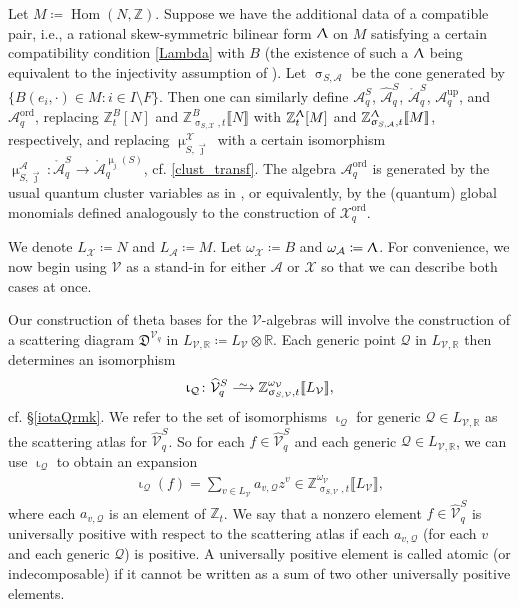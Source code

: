 \documentclass{amsart}
\DeclareMathOperator{\Hom}{Hom}
\DeclareMathOperator{\up}{up}
\DeclareMathOperator{\ord}{ord}
\let\llb=\llbracket
\let\rrb=\rrbracket
\let\bb=\mathbb
\let\rar=\rightarrow
\let\f=\mathfrak
\let\s=\mathcal
\let\wh=\widehat
\let\mr=\mathring
\def\risom{\buildrel\sim\over{\smashedlongrightarrow}}
\def\smashedlongrightarrow{\setbox0=\hbox{$\longrightarrow$}\ht0=1.25pt\box0}
\newcommand {\Zt} {\Z_t}
\newcommand {\sQ} {\mathcal{Q}}
\newcommand {\jj} {\vec{\jmath}}
\renewcommand{\iota}{\upiota}
\renewcommand{\sigma}{\upsigma}
\renewcommand{\Lambda}{\Uplambda}
\renewcommand{\mu}{\upmu}
\theoremstyle{plain}%
\newcommand{\Z}{{\mathbb Z}}
\theoremstyle{definition}
\theoremstyle{remark}
\begin{document}
Let $M\coloneqq \Hom(N,\bb{Z})$.  Suppose we have the additional data of a compatible pair, i.e., a rational skew-symmetric bilinear form $\Lambda$ on $M$ satisfying a certain compatibility condition \eqref{Lambda} with $B$ (the existence of such a $\Lambda$ being equivalent to the injectivity assumption of \cite{GHKK}).  Let $\sigma_{S,\s{A}}$ be the cone generated by $\{B(e_i,\cdot)\in M\colon i\in I\setminus F\}$.  Then one can similarly define $\s{A}_q^S$, $\wh{\s{A}}_q^S$, $\mr{\s{A}}_q^S$, $\s{A}_q^{\up}$, and $\s{A}_q^{\ord}$, replacing $\Z_t^B[N]$ and $\Z_{\sigma_{S,\s{X}},t}^B\llb N\rrb$ with $\Z_t^{\Lambda}[M]$ and $\Z_{\sigma_{S,\s{A}},t}^{\Lambda}\llb M\rrb$, respectively, and replacing $\mu_{S,\jj}^{\s{X}}$ with a certain isomorphism $\mu_{S,\jj}^{\s{A}}:\mr{\s{A}}_q^S\rar \mr{\s{A}}_q^{\mu_j(S)}$, cf. \eqref{clust_transf}.  The algebra $\s{A}_q^{\ord}$ is generated by the usual quantum cluster variables as in \cite{BZ}, or equivalently, by the (quantum) global monomials defined analogously to the construction of $\s{X}_q^{\ord}$.


We denote $L_{\s{X}}\coloneqq N$ and $L_{\s{A}}\coloneqq M$.  Let $\omega_{\s{X}}\coloneqq B$ and $\omega_{\s{A}}\coloneqq \Lambda$.  For convenience, we now begin using $\s{V}$ as a stand-in for either $\s{A}$ or $\s{X}$ so that we can describe both cases at once. 


Our construction of theta bases for the $\s{V}$-algebras will involve the construction of a scattering diagram $\f{D}^{\s{V}_q}$ in $L_{\s{V},\bb{R}}\coloneqq L_{\s{V}}\otimes\bb{R}$. Each generic point $\sQ$ in $L_{\s{V},\bb{R}}$ then determines an isomorphism \begin{align}\label{iotaQintro}
    \iota_{\sQ}\colon \wh{\s{V}}^S_{q} \risom \Z_{\sigma_{S,\s{V}},t}^{\omega_{\s{V}}}\llb L_{\s{V}}\rrb,
\end{align}
cf. \S \ref{iotaQrmk}.  We refer to the set of isomorphisms $\iota_{\sQ}$ for generic $\sQ\in L_{\s{V},\bb{R}}$ as the scattering atlas for $\wh{\s{V}}^S_q$.  So for each $f\in \wh{\s{V}}_q^S$ and each generic $\sQ\in L_{\s{V},\bb{R}}$, we can use $\iota_{\sQ}$ to obtain an expansion
\begin{align*}
    \iota_{\sQ}(f)=\sum_{v\in L_{\s{V}}} a_{v,\sQ}z^v\in \Z_{\sigma_{S,\s{V}},t}^{\omega_{\s{V}}}\llb L_{\s{V}}\rrb,
\end{align*}
where each $a_{v,\sQ}$ is an element of $\Zt$.  We say that a nonzero element $f\in \wh{\s{V}}^{S}_{q}$ is universally positive with respect to the scattering atlas if each $a_{v,\sQ}$ (for each $v$ and each generic $\sQ$) is positive.  A universally positive element is called atomic (or indecomposable) if it cannot be written as a sum of two other universally positive elements.
\end{document}
